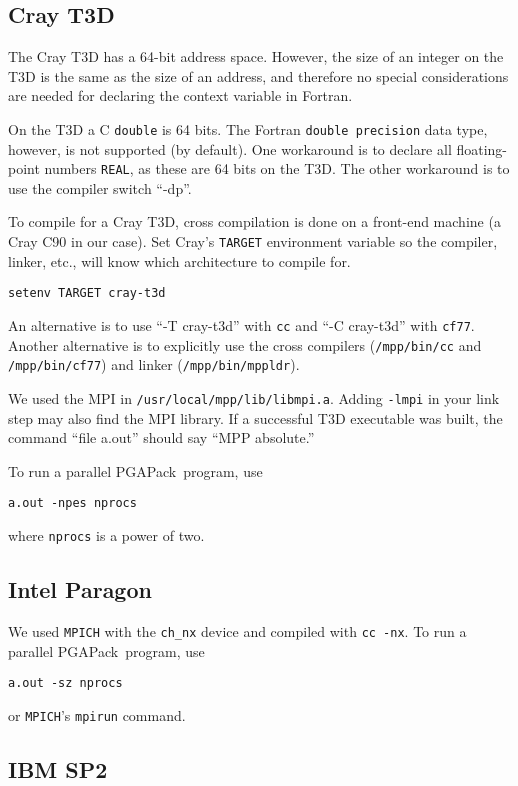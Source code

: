\documentclass{report}
\newcommand{\pga}{PGAPack}
\begin{document}
\subsection*{Cray T3D}

The Cray T3D has a 64-bit address space. However, the size of an integer on
the T3D is the same as the size of an address, and therefore no special
considerations are needed for declaring the context variable in Fortran.

On the T3D a C {\tt double} is 64 bits.  The Fortran {\tt double precision}
data type, however, is not supported (by default).  One workaround is to
declare all floating-point numbers {\tt REAL}, as these are 64 bits on the
T3D.  The other workaround is to use the compiler switch ``-dp''.

To compile for a Cray T3D, cross compilation is done on a front-end machine (a
Cray C90 in our case).  Set Cray's {\tt TARGET} environment variable so the
compiler, linker, etc., will know which architecture to compile for.
\begin{verbatim}
setenv TARGET cray-t3d
\end{verbatim}
An alternative is to use ``-T cray-t3d'' with {\tt cc} and ``-C cray-t3d''
with {\tt cf77}.  Another alternative is to explicitly use the cross
compilers ({\tt /mpp/bin/cc} and {\tt /mpp/bin/cf77}) and linker
({\tt /mpp/bin/mppldr}).

We used the MPI in {\tt /usr/local/mpp/lib/libmpi.a}.  Adding {\tt -lmpi} in
your link step may also find the MPI library.  If a successful T3D executable
was built, the command ``file a.out'' should say ``MPP absolute.''

To run a parallel \pga\ program, use
\begin{verbatim}
a.out -npes nprocs
\end{verbatim}
where {\tt nprocs} is a power of two.


\subsection*{Intel Paragon}

We used {\tt MPICH} with the {\tt ch\_nx} device and compiled with
{\tt cc -nx}. 
To run a parallel \pga\ program, use
\begin{verbatim}
a.out -sz nprocs
\end{verbatim}
or {\tt MPICH}'s {\tt mpirun} command.


\subsection*{IBM SP2}
\end{document}
